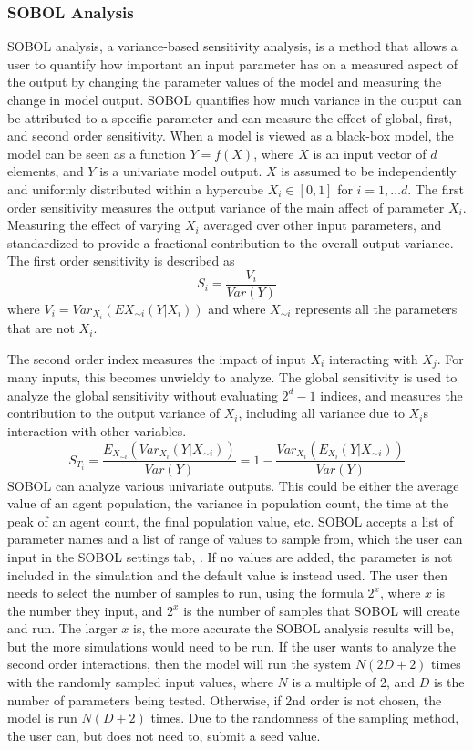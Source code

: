 \subsubsection{SOBOL Analysis}
SOBOL analysis, a variance-based sensitivity analysis, is a method that allows a user to quantify how important an input parameter has on a measured aspect of the output by changing the parameter values of the model and measuring the change in model output.
SOBOL quantifies how much variance in the output can be attributed to a specific parameter and can measure the effect of global, first, and second order sensitivity. 
When a model is viewed as a black-box model, the model can be seen as a function $Y=f(X)$, where $X$ is an input vector of $d$ elements, and $Y$ is a univariate model output.
$X$ is assumed to be independently and uniformly distributed within a hypercube $X_i \in [0, 1]$ for $i=1, \dots d$.
The first order sensitivity measures the output variance of the main affect of parameter $X_i$.
Measuring the effect of varying $X_i$ averaged over other input parameters, and standardized to provide a fractional contribution to the overall output variance.
The first order sensitivity is described as
\[
    S_i = \frac{V_i}{\textit{Var}(Y)}
\] where $V_i = \textit{Var}_{X_i}(E{X_{\sim i}}(Y|X_i))$ and where $X_{\sim i}$ represents all the parameters that are not $X_i$.
\newline


The second order index measures the impact of input $X_i$ interacting with $X_j$. For many inputs, this becomes unwieldy to analyze.
The global sensitivity is used to analyze the global sensitivity without evaluating $2^d-1$ indices, and measures the contribution to the output variance of $X_i$, including all variance due to $X_i$s interaction with other variables.
\[
    S_{T_i} = \frac{E_{X_{\sim i}}(\textit{Var}_{X_i}(Y|X_{\sim i}))}{\textit{Var}(Y)} = 1 - \frac{\textit{Var}_{X_i}(E_{X_i}(Y|X_{\sim i}))}{\textit{Var}(Y)}
\]
SOBOL can analyze various univariate outputs.
This could be either the average value of an agent population, the variance in population count, the time at the peak of an agent count, the final population value, etc. \newline
SOBOL accepts a list of parameter names and a list of range of values to sample from, which the user can input in the SOBOL settings tab, . 
If no values are added, the parameter is not included in the simulation and the default value is instead used. 
The user then needs to select the number of samples to run, using the formula $2^x$, where $x$ is the number they input, and $2^x$ is the number of samples that SOBOL will create and run.
The larger $x$ is, the more accurate the SOBOL analysis results will be, but the more simulations would need to be run. \newline
If the user wants to analyze the second order interactions, then the model will run the system $N(2D+2)$ times with the randomly sampled input values, where $N$ is a multiple of 2, and $D$ is the number of parameters being tested.
Otherwise, if 2nd order is not chosen, the model is run $N(D+2)$ times.
Due to the randomness of the sampling method, the user can, but does not need to, submit a seed value. 


